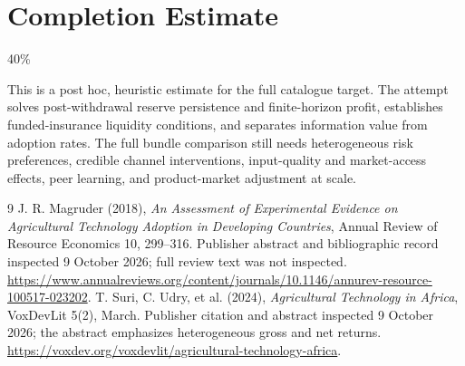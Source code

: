 \documentclass[11pt]{article}
\theoremstyle{remark}
\begin{document}
\section{Completion Estimate}
40\%

This is a post hoc, heuristic estimate for the full catalogue target.
The attempt solves post-withdrawal reserve persistence and finite-horizon profit, establishes funded-insurance liquidity conditions, and separates information value from adoption rates. The full bundle comparison still needs heterogeneous risk preferences, credible channel interventions, input-quality and market-access effects, peer learning, and product-market adjustment at scale.

\begin{thebibliography}{9}
 J. R. Magruder (2018), \emph{An Assessment of Experimental Evidence on Agricultural Technology Adoption in Developing Countries}, Annual Review of Resource Economics 10, 299--316. Publisher abstract and bibliographic record inspected 9 October 2026; full review text was not inspected. \url{https://www.annualreviews.org/content/journals/10.1146/annurev-resource-100517-023202}.
 T. Suri, C. Udry, et al. (2024), \emph{Agricultural Technology in Africa}, VoxDevLit 5(2), March. Publisher citation and abstract inspected 9 October 2026; the abstract emphasizes heterogeneous gross and net returns. \url{https://voxdev.org/voxdevlit/agricultural-technology-africa}.
\end{thebibliography}
\end{document}
